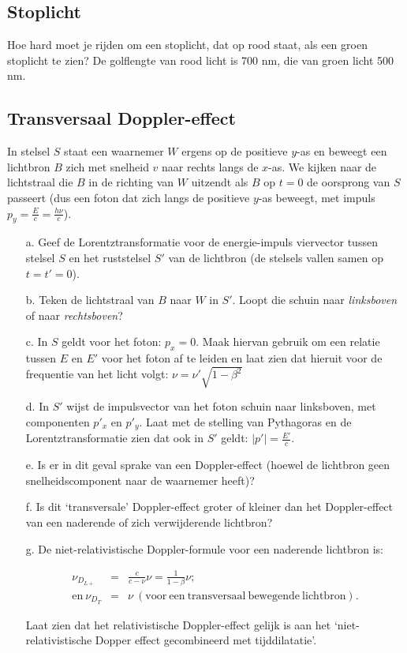 \subsection{Stoplicht}
Hoe hard moet je rijden om een stoplicht, dat op rood staat, als een groen
stoplicht te zien?
De golflengte van rood licht is 700 nm, die van groen licht 500 nm.

\subsection{Transversaal Doppler-effect}
In stelsel $S$ staat een waarnemer $W$ ergens op de positieve $y$-as en 
beweegt een lichtbron $B$ zich met snelheid $v$ naar rechts langs 
de $x$-as. We kijken naar de lichtstraal die $B$ in de richting van $W$ 
uitzendt als $B$ op $t=0$ de oorsprong van $S$ passeert (dus een 
foton dat zich langs de positieve $y$-as beweegt, 
met impuls $p_{y}=\frac{E}{c}=\frac{h\nu}{c}$).
\begin{itemize}
\item [a.]
Geef de Lorentztransformatie voor de energie-impuls viervector tussen 
stelsel $S$ en het ruststelsel $S'$ van de lichtbron 
(de stelsels vallen samen op $t=t'=0$).
\item [b.]
Teken de lichtstraal van $B$ naar $W$ in $S'$. Loopt die schuin naar 
{\it linksboven} of naar {\it rechtsboven}?
\item [c.]
In $S$ geldt voor het foton: $p_{x}=0$.
Maak hiervan gebruik om een relatie tussen $E$ en $E'$ voor het foton af te 
leiden en laat zien dat hieruit voor de frequentie van het licht volgt:  
$\nu= \nu '\sqrt{1-\beta ^{2}}$
\item [d.]
In $S'$ wijst de impulsvector van het foton schuin naar linksboven, 
met componenten $p'_{x}$  en  $p'_{y}$.
Laat met de stelling van Pythagoras en de Lorentztransformatie zien dat 
ook in $S'$ geldt:  $|p'|=\frac{E'}{c}$.
\item [e.]
Is er in dit geval sprake van een Doppler-effect (hoewel de lichtbron geen 
snelheidscomponent naar de waarnemer heeft)?
\item [f.]
Is dit `transversale' Doppler-effect groter of kleiner dan het Doppler-effect 
van een naderende of zich verwijderende lichtbron?
\item [g.]
De niet-relativistische Doppler-formule voor een naderende lichtbron is:

\begin{eqnarray}
\nu_{D_{L+}} &=& \frac{c}{c-\nu}\nu = \frac{1}{1-\beta}\nu ;   \\
 \mathrm{en\ }  \nu_{D_T} &=& \nu \  \mathrm{(voor\ 
een\ transversaal\ bewegende\ lichtbron).} \nonumber
\end{eqnarray}

Laat zien dat het relativistische Doppler-effect gelijk is aan het `niet-relativistische Dopper effect gecombineerd met tijddilatatie'.
\end{itemize}




